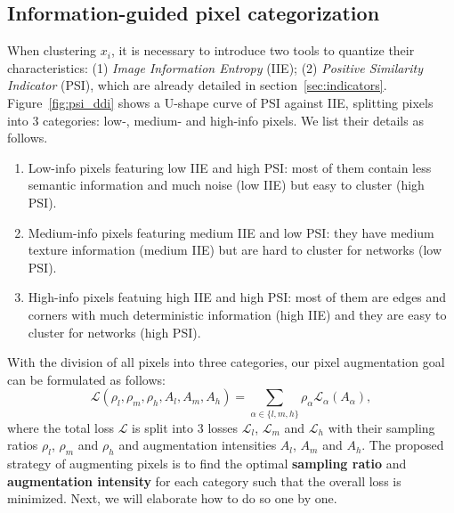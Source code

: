 \documentclass[10pt,twocolumn,letterpaper]{article}
\begin{document}
\subsection{Information-guided pixel categorization} \label{sec:lowinfo}
When clustering $x_i$, it is necessary to introduce two tools to quantize their characteristics: 
(1) {\it Image Information Entropy} (IIE); (2) {\it Positive Similarity Indicator} (PSI), which are already detailed in section~\ref{sec:indicators}. Figure~\ref{fig:psi_ddi} shows a U-shape curve of PSI against IIE, splitting pixels into 3 categories: low-, medium- and high-info pixels. We list their details as follows.
\begin{enumerate}
    \item Low-info pixels featuring low IIE and high PSI: most of them contain less semantic information and much noise (low IIE) but easy to cluster (high PSI).
    \item Medium-info pixels featuring medium IIE and low PSI: they have medium texture information (medium IIE) but are hard to cluster for networks (low PSI).
    \item High-info pixels featuing high IIE and high PSI: most of them are edges and corners with much deterministic information (high IIE) and they are easy to cluster for networks (high PSI).
\end{enumerate}

With the division of all pixels into three categories, our pixel augmentation goal can be formulated as follows:
\begin{equation}
    \mathcal{L}(\rho_l,\rho_m,\rho_h, A_l, A_m, A_h) = \sum_{\alpha \in\{l,m,h\}} \rho_\alpha \mathcal{L}_{\alpha} (A_\alpha),
\label{eq:L}
\end{equation}
where the total loss $\mathcal{L}$ is split into 3 losses $\mathcal{L}_l$, $\mathcal{L}_m$ and $\mathcal{L}_h$ with their sampling ratios $\rho_l$, $\rho_m$ and $\rho_h$ and augmentation intensities $A_l$, $A_m$ and $A_h$. 
The proposed strategy of augmenting pixels is to find the optimal {\bf sampling ratio} and {\bf augmentation intensity} for each category such that the overall loss is minimized. Next, we will elaborate how to do so one by one.
\end{document}
